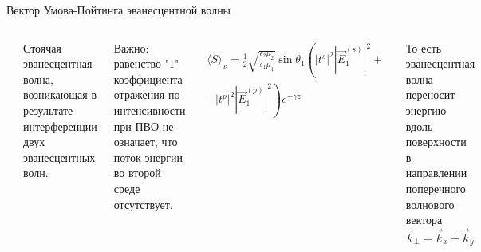 \documentclass[9pt, compress, xcolor=table]{beamer}
\begin{document}
\begin{frame}{Вектор Умова-Пойтинга эванесцентной волны}
    
    \begin{columns}[c]

\column{6.5cm}

\begin{center}
\includegraphics[width=0.9\textwidth]{stand}
\end{center}

Стоячая эванесцентная волна, возникающая в результате интерференции двух эванесцентных волн.

\column{6cm}

\textcolor{red!50!black}{Важно}: равенство "$1$" коэффициента отражения по интенсивности при ПВО не означает, что поток энергии во второй среде отсутствует.

\begin{multline*}
    \langle S\rangle_x=\frac{1}{2}\sqrt{\frac{\epsilon_2\mu_2}{\epsilon_1\mu_1}}\sin{\theta_1}\left(|t^s|^2|\vec E_1^{(s)}|^2 +\right.\\\left.+|t^p|^2|\vec E_1^{(p)}|^2 \right)e^{-\gamma z}
\end{multline*}

То есть эванесцентная волна переносит энергию вдоль поверхности в направлении поперечного волнового вектора $\vec k_{\perp}=\vec k_x+\vec k_y$
\end{columns}
\end{frame}
\end{document}
